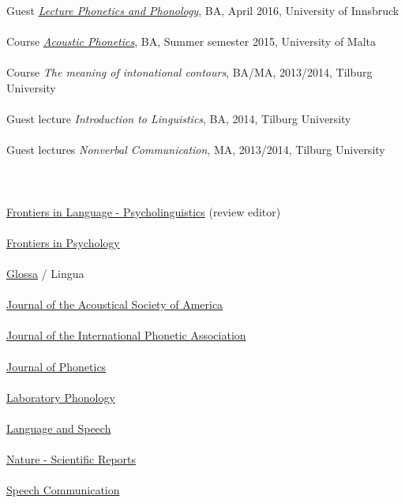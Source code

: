 \documentclass[a4paper,11pt]{article}
\begin{document}
Guest \href{http://www.uibk.ac.at/studium/angebot/ba-sprachwissenschaft/}{\textit{Lecture Phonetics and Phonology}}, BA, April 2016, University of Innsbruck\\\\
Course \href{http://www.um.edu.mt/linguistics/studyunit/LIN2099}{\textit{Acoustic Phonetics}}, BA, Summer semester 2015, University of Malta\\\\
Course \textit{The meaning of intonational contours}, BA/MA, 2013/2014, Tilburg University\\\\
Guest lecture \textit{Introduction to Linguistics}, BA, 2014, Tilburg University\\\\
Guest lectures \textit{Nonverbal Communication}, MA, 2013/2014, Tilburg University\\\\

\newpage
\section*{ }
\href{https://www.frontiersin.org/journals/language-sciences/sections/psycholinguistics}{Frontiers in Language - Psycholinguistics} (review editor)\\\\
\href{https://www.frontiersin.org/journals/psychology}{Frontiers in Psychology}\\\\
\href{https://www.glossa-journal.org/}{Glossa} / Lingua\\\\
\href{https://asa.scitation.org/journal/jas}{Journal of the Acoustical Society of America}\\\\
\href{https://www.cambridge.org/core/journals/journal-of-the-international-phonetic-association}{Journal of the International Phonetic Association}\\\\
\href{https://www.journals.elsevier.com/journal-of-phonetics/}{Journal of Phonetics}\\\\
\href{https://www.journal-labphon.org/}{Laboratory Phonology}\\\\
\href{https://journals.sagepub.com/home/las}{Language and Speech}\\\\
\href{https://www.nature.com/srep/}{Nature - Scientific Reports}\\\\
\href{https://www.journals.elsevier.com/speech-communication}{Speech Communication}\\\\
\end{document}
